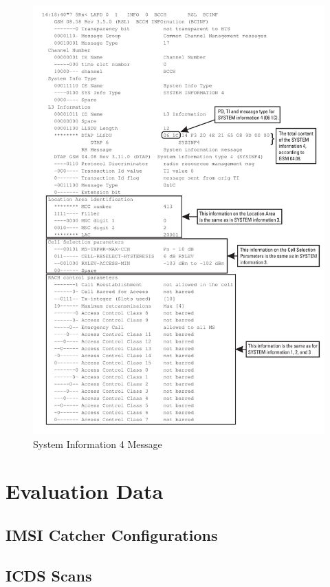 \begin{figure}
\centering
\includegraphics[width=.9\textwidth]{../Images/sysinfo4}
\caption{System Information 4 Message}
\end{figure}
\chapter{Evaluation Data}
\section{IMSI Catcher Configurations}
\section{ICDS Scans}
